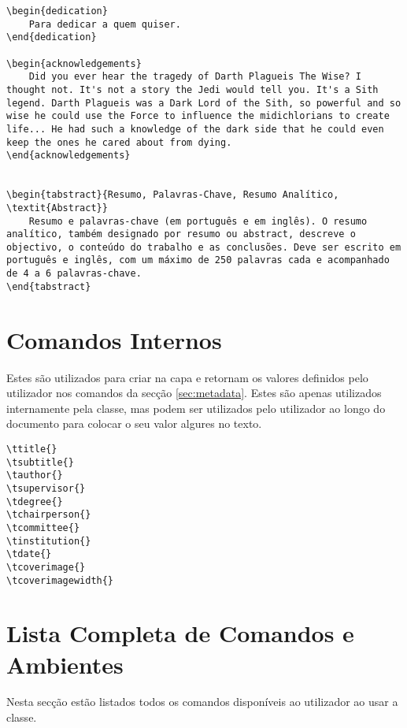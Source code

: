 \documentclass{../ist-thesis}
\begin{document}
\begin{verbatim}
\begin{dedication}
    Para dedicar a quem quiser.
\end{dedication}

\begin{acknowledgements}
    Did you ever hear the tragedy of Darth Plagueis The Wise? I thought not. It's not a story the Jedi would tell you. It's a Sith legend. Darth Plagueis was a Dark Lord of the Sith, so powerful and so wise he could use the Force to influence the midichlorians to create life... He had such a knowledge of the dark side that he could even keep the ones he cared about from dying.
\end{acknowledgements}


\begin{tabstract}{Resumo, Palavras-Chave, Resumo Analítico, \textit{Abstract}}
    Resumo e palavras-chave (em português e em inglês). O resumo analítico, também designado por resumo ou abstract, descreve o objectivo, o conteúdo do trabalho e as conclusões. Deve ser escrito em português e inglês, com um máximo de 250 palavras cada e acompanhado de 4 a 6 palavras-chave.
\end{tabstract}
\end{verbatim}

\section{Comandos Internos}\label{sec:internal}

Estes são utilizados para criar na capa e retornam os valores definidos pelo utilizador nos comandos da secção \ref{sec:metadata}. Estes são apenas utilizados internamente pela classe, mas podem ser utilizados pelo utilizador ao longo do documento para colocar o seu valor algures no texto.

\begin{verbatim}
\ttitle{}
\tsubtitle{}
\tauthor{}
\tsupervisor{}
\tdegree{}
\tchairperson{}
\tcommittee{}
\tinstitution{}
\tdate{}
\tcoverimage{}
\tcoverimagewidth{}
\end{verbatim}

\section{Lista Completa de Comandos e Ambientes}

Nesta secção estão listados todos os comandos disponíveis ao utilizador ao usar a classe.
\end{document}
